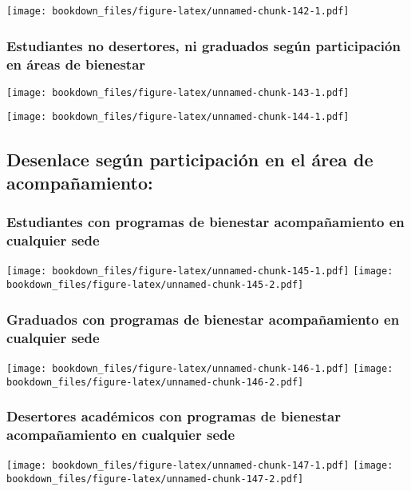 \documentclass[]{article}
\theoremstyle{definition}
\theoremstyle{definition}
\theoremstyle{definition}
\theoremstyle{remark}
\begin{document}
\texttt{[image: bookdown\_files/figure-latex/unnamed-chunk-142-1.pdf]}

\subsubsection{Estudiantes no desertores, ni graduados según
participación en áreas de
bienestar}\label{estudiantes-no-desertores-ni-graduados-segun-participacion-en-areas-de-bienestar}

\texttt{[image: bookdown\_files/figure-latex/unnamed-chunk-143-1.pdf]}

\texttt{[image: bookdown\_files/figure-latex/unnamed-chunk-144-1.pdf]}

\subsection{Desenlace según participación en el área de
acompañamiento:}\label{desenlace-segun-participacion-en-el-area-de-acompanamiento}

\subsubsection{Estudiantes con programas de bienestar acompañamiento en
cualquier
sede}\label{estudiantes-con-programas-de-bienestar-acompanamiento-en-cualquier-sede}

\texttt{[image: bookdown\_files/figure-latex/unnamed-chunk-145-1.pdf]}
\texttt{[image: bookdown\_files/figure-latex/unnamed-chunk-145-2.pdf]}

\subsubsection{Graduados con programas de bienestar acompañamiento en
cualquier
sede}\label{graduados-con-programas-de-bienestar-acompanamiento-en-cualquier-sede}

\texttt{[image: bookdown\_files/figure-latex/unnamed-chunk-146-1.pdf]}
\texttt{[image: bookdown\_files/figure-latex/unnamed-chunk-146-2.pdf]}

\subsubsection{Desertores académicos con programas de bienestar
acompañamiento en cualquier
sede}\label{desertores-academicos-con-programas-de-bienestar-acompanamiento-en-cualquier-sede}

\texttt{[image: bookdown\_files/figure-latex/unnamed-chunk-147-1.pdf]}
\texttt{[image: bookdown\_files/figure-latex/unnamed-chunk-147-2.pdf]}
\end{document}
